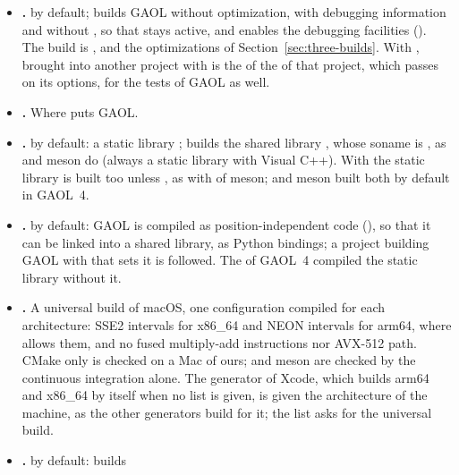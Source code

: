 \documentclass[12pt,a4paper,twoside,openright]{book}
\begin{document}
\begin{itemize}
\item[$\bullet$] \textbf{.}  by
  default;  builds GAOL without optimization, with debugging
  information and without , so that  stays
  active, and enables the debugging facilities
  (). The  build is
  ,  and the optimizations of
  Section~\ref{sec:three-builds}. With ,
   brought into another project with
   is the  of the
   of that project, which passes on its options, for the tests
  of GAOL as well.
\item[$\bullet$] \textbf{.} Where
   puts GAOL.
\item[$\bullet$] \textbf{.}  by default:
  a static library ;  builds the shared library
  , whose soname is , as
   and meson do (always a static library with Visual C++).
  With  the static library is built too unless
  , as with  of
  meson;  and meson built both by default in
  GAOL~4.\newinvfive
\item[$\bullet$] \textbf{.}
   by default: GAOL is compiled as position-independent code
  (), so that it can be linked into a shared library, as
  Python bindings; a project building GAOL with  that sets
  it is followed. The  of GAOL~4 compiled the static library
  without it.\newinvfive
\item[$\bullet$] \textbf{.} A universal
  build of macOS, one configuration compiled for each architecture: SSE2
  intervals for x86\_64 and NEON intervals for arm64, where
   allows them, and no fused multiply-add instructions nor
  AVX-512 path. CMake only is checked on a Mac of ours;  and
  meson are checked by the continuous integration alone. The generator of
  Xcode, which builds arm64 and x86\_64 by itself when no list is given, is
  given the architecture of the machine, as the other generators build for
  it; the list  asks for the universal build.\newinvfive
\item[$\bullet$] \textbf{.}  by default: builds

\end{itemize}
\end{document}

